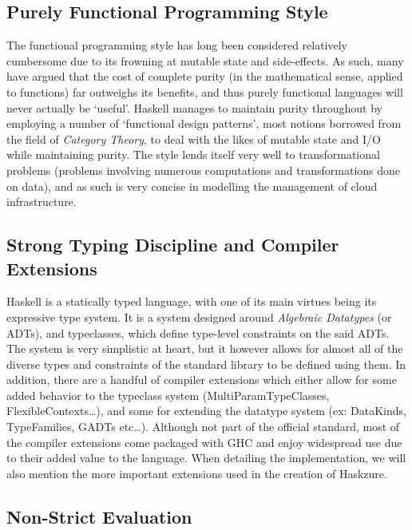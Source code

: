 \documentclass[11pt]{report}
\begin{document}
\subsection{Purely Functional Programming Style}

The functional programming style has long been considered relatively cumbersome
due to its frowning at mutable state and side-effects. As such, many have
argued that the cost of complete purity (in the mathematical sense, applied to
functions) far outweighs its benefits, and thus purely functional languages
will never actually be `useful'. Haskell manages to maintain purity throughout
by employing a number of `functional design patterns', most notions borrowed
from the field of \textit{Category Theory}, to deal with the likes of
mutable state and I/O while maintaining purity.\newline
The style lends itself very well to transformational problems (problems
involving numerous computations and transformations done on data), and as such
is very concise in modelling the management of cloud infrastructure.

\subsection{Strong Typing Discipline and Compiler Extensions}

Haskell is a statically typed language, with one of its main virtues being
its expressive type system. It is a system designed around
\textit{Algebraic Datatypes} (or ADTs), and typeclasses, which
define type-level constraints on the said ADTs. The system is very simplistic
at heart, but it however allows for almost all of the diverse types and
constraints of the standard library to be defined using them. \newline
In addition, there are a handful of compiler extensions which either allow for
some added behavior to the typeclass system (MultiParamTypeClasses,
FlexibleContexts\ldots), and some for extending the datatype system (ex:
DataKinds, TypeFamilies, GADTs etc\ldots). Although not part of the official standard,
most of the compiler extensions come packaged with GHC and enjoy widespread
use due to their added value to the language. When detailing the
implementation, we will also mention the more important extensions used in the
creation of Haskzure.

\subsection{Non-Strict Evaluation}
\end{document}
